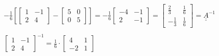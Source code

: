 $$
\begin{aligned}
&-\frac{1}{6}\left[\left[\begin{array}{cc}
1 & -1 \\
2 & 4
\end{array}\right]-\left[\begin{array}{ll}
5 & 0 \\
0 & 5
\end{array}\right]\right]=-\frac{1}{6}\left[\begin{array}{cc}
-4 & -1 \\
2 & -1
\end{array}\right]=\left[\begin{array}{cc}
\frac{2}{3} & \frac{1}{6} \\
-\frac{1}{3} & \frac{1}{6}
\end{array}\right] = \underline{\underline{A}}^{-1}\\
\\
&{\left[\begin{array}{cc}
1 & -1 \\
2 & 4
\end{array}\right]^{-1}=\frac{1}{6} \cdot\left[\begin{array}{cc}
4 & 1 \\
-2 & 1
\end{array}\right]}
\end{aligned}
$$

